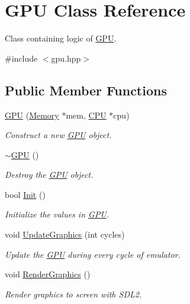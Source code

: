\hypertarget{classGPU}{}\section{G\+PU Class Reference}
\label{classGPU}


Class containing logic of \mbox{\hyperlink{classGPU}{G\+PU}}.  




{\ttfamily \#include $<$gpu.\+hpp$>$}

\subsection*{Public Member Functions}
\begin{DoxyCompactItemize}
\item 
\mbox{\hyperlink{classGPU_a18e803c48776e14aa5b04d58a35ec4ac}{G\+PU}} (\mbox{\hyperlink{classMemory}{Memory}} $\ast$mem, \mbox{\hyperlink{classCPU}{C\+PU}} $\ast$cpu)
\begin{DoxyCompactList}\small\item\em Construct a new \mbox{\hyperlink{classGPU}{G\+PU}} object. \end{DoxyCompactList}\item 
\mbox{\label{classGPU_ac4d153a08d3b9f40e5a8f1634f4a9e78}} 
\mbox{\hyperlink{classGPU_ac4d153a08d3b9f40e5a8f1634f4a9e78}{$\sim$\+G\+PU}} ()
\begin{DoxyCompactList}\small\item\em Destroy the \mbox{\hyperlink{classGPU}{G\+PU}} object. \end{DoxyCompactList}\item 
bool \mbox{\hyperlink{classGPU_a712acb0ed0ea3baf05379b26922d43f7}{Init}} ()
\begin{DoxyCompactList}\small\item\em Initialize the values in \mbox{\hyperlink{classGPU}{G\+PU}}. \end{DoxyCompactList}\item 
void \mbox{\hyperlink{classGPU_af0b1df5eb7c5270a81fc12aebb89e641}{Update\+Graphics}} (int cycles)
\begin{DoxyCompactList}\small\item\em Update the \mbox{\hyperlink{classGPU}{G\+PU}} during every cycle of emulator. \end{DoxyCompactList}\item 
\mbox{\label{classGPU_af176f18efc74597769280ecc610daea5}} 
void \mbox{\hyperlink{classGPU_af176f18efc74597769280ecc610daea5}{Render\+Graphics}} ()
\begin{DoxyCompactList}\small\item\em Render graphics to screen with S\+D\+L2. \end{DoxyCompactList}\end{DoxyCompactItemize}


